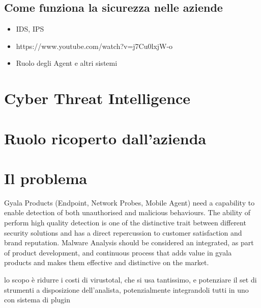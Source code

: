 \subsection{Come funziona la sicurezza nelle aziende}
\begin{itemize}
    \item IDS, IPS 
    \item https://www.youtube.com/watch?v=j7Cu0lxjW-o
    \item Ruolo degli Agent e altri sistemi
\end{itemize}

\section{Cyber Threat Intelligence}
\label{chap:cyber_threat_intelligence}

\section{Ruolo ricoperto dall'azienda}

\section{Il problema}
Gyala Products (Endpoint, Network Probes, Mobile Agent) need a capability to enable detection of both unauthorised and malicious behaviours.
The ability of perform high quality detection is one of the distinctive trait between different security solutions and has a direct repercussion to customer satisfaction and brand reputation.  
Malware Analysis should be considered an integrated, as part of product development, and continuous process that adds value in gyala products and makes them effective and distinctive on the market.

lo scopo è ridurre i costi di virustotal, che si usa tantissimo, e potenziare il set di strumenti a disposizione dell'analista, potenzialmente integrandoli tutti in uno con sistema di plugin
